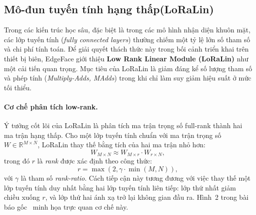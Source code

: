 





\subsection{Mô-đun tuyến tính hạng thấp(LoRaLin)}

 
Trong các kiến trúc học sâu, đặc biệt là trong các mô hình nhận diện khuôn mặt, các lớp tuyến tính (\textit{fully connected layers}) thường chiếm một tỷ lệ lớn số tham số và chi phí tính toán. Để giải quyết thách thức này trong bối cảnh triển khai trên thiết bị biên, EdgeFace giới thiệu \textbf{Low Rank Linear Module (LoRaLin)} như một cải tiến quan trọng. Mục tiêu của LoRaLin là giảm đáng kể số lượng tham số và phép tính (\textit{Multiply-Adds, MAdds}) trong khi chỉ làm suy giảm hiệu suất ở mức tối thiểu.

\paragraph{Cơ chế phân tích low-rank.} 
Ý tưởng cốt lõi của LoRaLin là phân tích ma trận trọng số full-rank thành hai ma trận hạng thấp. Cho một lớp tuyến tính chuẩn với ma trận trọng số $W \in \mathbb{R}^{M \times N}$, LoRaLin thay thế bằng tích của hai ma trận nhỏ hơn:
\[
    W_{M \times N} \approx W_{M \times r} \cdot W_{r \times N},
\]
trong đó $r$ là \textit{rank} được xác định theo công thức:
\[
    r = \max(2, \gamma \cdot \min(M,N)),
\]
với $\gamma$ là tham số \textit{rank-ratio}. Cách tiếp cận này tương đương với việc thay thế một lớp tuyến tính duy nhất bằng hai lớp tuyến tính liên tiếp: lớp thứ nhất giảm chiều xuống $r$, và lớp thứ hai ánh xạ trở lại không gian đầu ra. Hình~2 trong bài báo gốc~\cite{george2024edgeface} minh họa trực quan cơ chế này.\\



